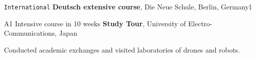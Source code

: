 \begin{rubric}{\faGlobe\texttt{International}}
    \entry*[10.2022 -- 12.2022]%
        \textbf{Deutsch extensive course}, Die Neue Schule, Berlin, Germany1
        \par A1 Intensive course in 10 weeks
    \entry*[08.2018 -- 08.2018]%
        \textbf{Study Tour}, University of Electro-Communications, Japan
            \par Conducted academic exchanges and visited laboratories of drones and robots.
    \end{rubric}